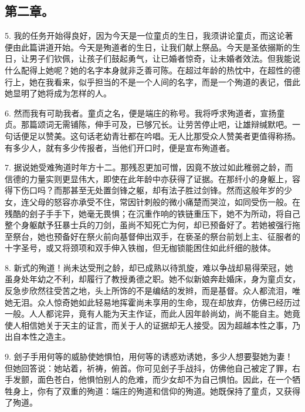 \subsection{第二章。}

\par

5. 我的任务开始得良好，因为今天是一位童贞的生日，我须讲论童贞，而这论著便由此篇讲道开始。今天是殉道者的生日，让我们献上祭品。今天是圣依搦斯的生日，让男子们钦佩，让孩子们鼓起勇气，让已婚者惊奇，让未婚者效法。但我能说什么配得上她呢？她的名字本身就非乏善可陈。在超过年龄的热忱中，在超性的德行上，她在我看来，似乎担当的不是一个人间的名字，而是一个殉道的表记，借此她显明了她将成为怎样的人。\par

6. 然而我有可助我者。童贞之名，便是端庄的称号。我将呼求殉道者，宣扬童贞。那篇颂词无需铺陈，伸手可及，已够冗长。让劳苦停止吧，让雄辩缄默吧。一句话便足以赞美。这句话老幼青壮都在吟唱。无人比那受众人赞美者更值得称扬。有多少人，就有多少传报者，当他们开口时，便是宣布殉道者。\par

7. 据说她受难殉道时年方十二。那残忍更加可憎，因竟不放过如此稚弱之龄，而信德的力量实则更显伟大，即使在此年龄中亦获得了证据。在那纤小的身躯上，容得下伤口吗？而那甚至无处置剑锋之躯，却有法子胜过剑锋。然而这般年岁的少女，连父母的怒容亦承受不住，常因针刺般的微小痛楚而哭泣，如同受伤一般。在残酷的刽子手手下，她毫无畏惧；在沉重作响的铁链重压下，她不为所动，将自己整个身躯献予狂暴士兵的刀剑，虽尚不知死亡为何，却已预备好了。若她被强行拖至祭台，她也预备好在祭火前向基督伸出双手，在亵圣的祭台前划上主、征服者的十字圣号，或又将颈项和双手伸入铁枷，但无枷锁能困住如此纤细的肢体。\par

8. 新式的殉道！尚未达受刑之龄，却已成熟以待凯旋，难以争战却易得荣冠，她虽身处年幼之不利，却履行了教授勇德之职。她不似新娘奔赴婚床，身为童贞女，反急步欣然往受苦之地，头上所饰的不是编结的发辫，而是基督。众人都流泪，唯她无泪。众人惊奇她如此轻易地挥霍尚未享用的生命，现在却放弃，仿佛已经历过一般。人人都诧异，竟有人能为天主作证，而此人因年龄尚幼，尚不能自主。她竟使人相信她关于天主的证言，而关于人的证据却无人接受。因为超越本性之事，乃出自本性之造主。\par

9. 刽子手用何等的威胁使她惧怕，用何等的诱惑劝诱她，多少人想要娶她为妻！但她回答说：她站着，祈祷，俯首。你可见刽子手战抖，仿佛他自己被定了罪，右手发颤，面色苍白，他惧怕别人的危难，而少女却不为自己惧怕。因此，在一个牺牲身上，你有了双重的殉道：端庄的殉道和信仰的殉道。她既保持了童贞，又获得了殉道。\par

